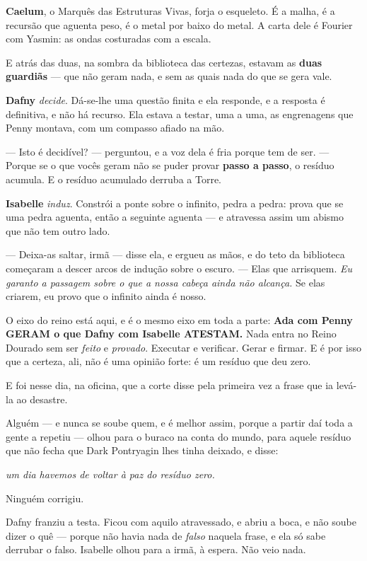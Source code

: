 \documentclass[livro.tex]{subfiles}
\begin{document}
\textbf{Caelum}, o Marquês das Estruturas Vivas, forja o esqueleto. É a malha, é a recursão que aguenta peso, é o
metal por baixo do metal. A carta dele é Fourier com Yasmin: as ondas costuradas com a escala.

E atrás das duas, na sombra da biblioteca das certezas, estavam as \textbf{duas guardiãs} --- que não geram nada, e
sem as quais nada do que se gera vale.

\textbf{Dafny} \emph{decide}. Dá-se-lhe uma questão finita e ela responde, e a resposta é definitiva, e não há
recurso. Ela estava a testar, uma a uma, as engrenagens que Penny montava, com um compasso afiado na mão.

--- Isto é decidível? --- perguntou, e a voz dela é fria porque tem de ser. --- Porque se o que vocês geram não se
puder provar \textbf{passo a passo}, o resíduo acumula. E o resíduo acumulado derruba a Torre.

\textbf{Isabelle} \emph{induz}. Constrói a ponte sobre o infinito, pedra a pedra: prova que se uma pedra aguenta,
então a seguinte aguenta --- e atravessa assim um abismo que não tem outro lado.

--- Deixa-as saltar, irmã --- disse ela, e ergueu as mãos, e do teto da biblioteca começaram a descer arcos de
indução sobre o escuro. --- Elas que arrisquem. \emph{Eu garanto a passagem sobre o que a nossa cabeça ainda não
alcança.} Se elas criarem, eu provo que o infinito ainda é nosso.

O eixo do reino está aqui, e é o mesmo eixo em toda a parte: \textbf{Ada com Penny GERAM o que Dafny com Isabelle ATESTAM.} Nada entra no Reino Dourado sem ser \emph{feito} e \emph{provado}. Executar e verificar. Gerar e
firmar. E é por isso que a certeza, ali, não é uma opinião forte: é um resíduo que deu zero.

\medskip

E foi nesse dia, na oficina, que a corte disse pela primeira vez a frase que ia levá-la ao desastre.

Alguém --- e nunca se soube quem, e é melhor assim, porque a partir daí toda a gente a repetiu --- olhou para o
buraco na conta do mundo, para aquele resíduo que não fecha que Dark Pontryagin lhes tinha deixado, e disse:

\begin{center}\itshape
um dia havemos de voltar à paz do resíduo zero.
\end{center}

Ninguém corrigiu.

Dafny franziu a testa. Ficou com aquilo atravessado, e abriu a boca, e não soube dizer o quê --- porque não havia
nada de \emph{falso} naquela frase, e ela só sabe derrubar o falso. Isabelle olhou para a irmã, à espera. Não veio
nada.
\end{document}
